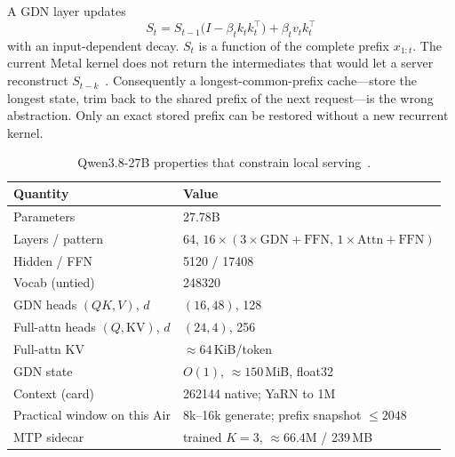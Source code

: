 A GDN layer updates
\begin{equation}
S_t = S_{t-1}\bigl(I - \beta_t k_t k_t^\top\bigr) + \beta_t v_t k_t^\top
\label{eq:gdn}
\end{equation}
with an input-dependent decay. $S_t$ is a function of the complete prefix $x_{1:t}$. The current Metal kernel does not return the intermediates that would let a server reconstruct $S_{t-k}$~\citep{vllm36649}. Consequently a longest-common-prefix cache---store the longest state, trim back to the shared prefix of the next request---is the wrong abstraction. Only an exact stored prefix can be restored without a new recurrent kernel.

\begin{table}[t]
\centering
\caption{Qwen3.8-27B properties that constrain local serving~\citep{qwen38card,yarn2024}.}
\label{tab:qwen38}
\small
\begin{tabular}{@{}ll@{}}
\toprule
Quantity & Value \\
\midrule
Parameters & 27.78B \\
Layers / pattern & 64, $16{\times}(3{\times}\mathrm{GDN{+}FFN},\,1{\times}\mathrm{Attn{+}FFN})$ \\
Hidden / FFN & 5120 / 17408 \\
Vocab (untied) & 248320 \\
GDN heads $(QK,V)$, $d$ & $(16,48)$, 128 \\
Full-attn heads $(Q,\mathrm{KV})$, $d$ & $(24,4)$, 256 \\
Full-attn KV & ${\approx}64$\,KiB/token \\
GDN state & $O(1)$, ${\approx}150$\,MiB, float32 \\
Context (card) & 262144 native; YaRN to 1M~\citep{yarn2024} \\
Practical window on this Air & 8k--16k generate; prefix snapshot $\le 2048$ \\
MTP sidecar & trained $K{=}3$, ${\approx}66.4$M / 239\,MB \\
\bottomrule
\end{tabular}
\end{table}

